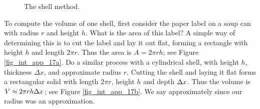 \begin{figure}[h]
\centering
\qquad
{}
\qquad
{}
\caption{The shell method.}
\end{figure}

To compute the volume of one shell, first consider the paper label on a soup can with radius $r$ and height $h$. What is the area of this label? A simple way of determining this is to cut the label and lay it out flat, forming a rectangle with height $h$ and length $2\pi r$. Thus the area is $A = 2\pi rh$; see Figure \ref{fig_int_app_17a}.
Do a similar process with a cylindrical shell, with height $h$, thickness $\Delta x$, and approximate radius $r$. Cutting the shell and laying it flat forms a rectangular solid with length $2\pi r$, height $h$ and depth $\Delta x$. Thus the volume is $V \approx 2\pi rh\Delta x$; see Figure \ref{fig_int_app_17b}. We say approximately since our radius was an approximation.


